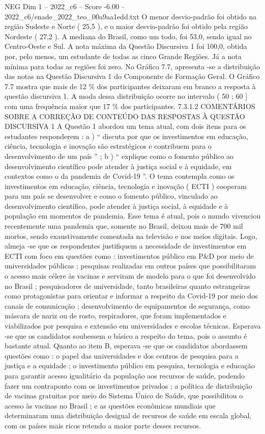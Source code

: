 \begin{textsample}{NEG Dim 1 – 2022\_c6 – Score -6.00 – 2022\_c6/enade\_2022\_teo\_00a9aa1edd.txt}
O menor desvio-padrão foi obtido na região Sudeste e Norte ( 25,5 ), e o maior desvio-padrão foi obtido pela região Nordeste ( 27,2 ).
A mediana do Brasil, como um todo, foi 53,0, sendo igual no Centro-Oeste e Sul.
A nota máxima da Questão Discursiva 1 foi 100,0, obtida por, pelo menos, um estudante de todas as cinco Grande Regiões.
Já a nota mínima para todas as regiões foi zero.
No Gráfico 7.7, apresenta -se a distribuição das notas na Questão Discursiva 1 do Componente de Formação Geral.
O Gráfico 7.7 mostra que mais de 12 \% dos participantes deixaram em branco a resposta à questão discursiva 1.
A moda dessa distribuição ocorre no intervalo ( 50 ; 60 ] com uma frequência maior que 17 \% dos participantes. 7.3.1.2 COMENTÁRIOS SOBRE A CORREÇÃO DE CONTEÚDO DAS RESPOSTAS À QUESTÃO DISCURSIVA 1 A Questão 1 abordou um tema atual, com dois itens para os estudantes responderem : a ) “ discuta por que os investimentos em educação, ciência, tecnologia e inovação são estratégicos e contribuem para o desenvolvimento de um país ” ; b ) “ explique como o fomento público ao desenvolvimento científico pode atender à justiça social e à equidade, em contextos como o da pandemia de Covid-19 ”.
O tema contempla como os investimentos em educação, ciência, tecnologia e inovação ( ECTI ) cooperam para um país se desenvolver e como o fomento público, vinculado ao desenvolvimento científico, pode atender à justiça social, à equidade e à população em momentos de pandemia.
Esse tema é atual, pois o mundo vivenciou recentemente uma pandemia que, somente no Brasil, deixou mais de 700 mil mortos, sendo exaustivamente comentada na televisão e nos meios digitais.
Logo, almeja -se que os respondentes justifiquem a necessidade de investimentos em ECTI com foco em questões como : investimentos público em P\&D por meio de universidades públicas ; pesquisas realizadas em outros países que possibilitaram o acesso mais célere às vacinas e serviram de modelo para o que foi desenvolvido no Brasil ; pesquisadores de universidade, tanto brasileiras quanto estrangeiras como protagonistas para orientar e informar a respeito da Covid-19 por meio dos canais de comunicação ; desenvolvimento de equipamentos de segurança, como máscara de nariz ou de rosto, respiradores, que foram implementados e viabilizados por pesquisa e extensão em universidades e escolas técnicas.
Esperava -se que os candidatos soubessem o básico a respeito do tema, pois o assunto é bastante atual.
Quanto ao item B, esperava -se que os candidatos abordassem questões como : o papel das universidades e dos centros de pesquisa para a justiça e a equidade ; o investimento público em pesquisa, tecnologia e educação para garantir acesso igualitário da população aos recursos de saúde, podendo fazer um contraponto com os investimentos privados ; a política de distribuição de vacinas gratuitas por meio do Sistema Único de Saúde, que possibilitou o acesso às vacinas no Brasil ; e as questões econômicas mundiais que determinaram uma distribuição desigual de recursos de saúde em escala global, com os países mais ricos retendo a maior parte desses recursos.

\end{textsample}
